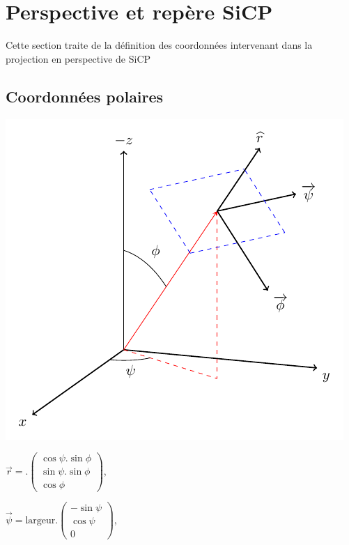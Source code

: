 

\section{Perspective et repère SiCP}
Cette section traite de la définition des coordonnées intervenant dans la projection en perspective de SiCP
\subsection{Coordonnées polaires}
%

\begin{center}
	\includegraphics[scale=.97]{./illustration/repereSiCP}
\end{center}

	$\overrightarrow{r}  = \text{} .
	\begin{pmatrix}
		\cos \psi . \sin \phi \\
		\sin \psi . \sin \phi \\
		\cos \phi
	\end{pmatrix}$,

	$\overrightarrow{\psi} = \text{largeur} .
	\begin{pmatrix}
		- \sin \psi \\
		\cos \psi \\
		0
	\end{pmatrix}$,

